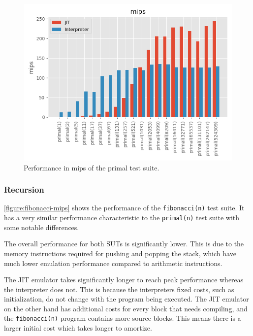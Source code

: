 \begin{figure}
    \centering
    \includegraphics{output/graphs/tests/primal/mips.png}
    \caption{Performance in mips of the primal test suite.}
    \label{figure:primal-mips}
\end{figure}

\subsubsection{Recursion}

\autoref{figure:fibonacci-mips} shows the performance of the \texttt{fibonacci(n)} test suite. It has a very similar performance characteristic to the \texttt{primal(n)} test suite with some notable differences.

The overall performance for both SUTs is significantly lower. This is due to the memory instructions required for pushing and popping the stack, which have much lower emulation performance compared to arithmetic instructions.

The JIT emulator takes significantly longer to reach peak performance whereas the interpreter does not. This is because the interpreters fixed costs, such as initialization, do not change with the program being executed. The JIT emulator on the other hand has additional costs for every block that needs compiling, and the \texttt{fibonacci(n)} program contains more source blocks. This means there is a larger initial cost which takes longer to amortize.

